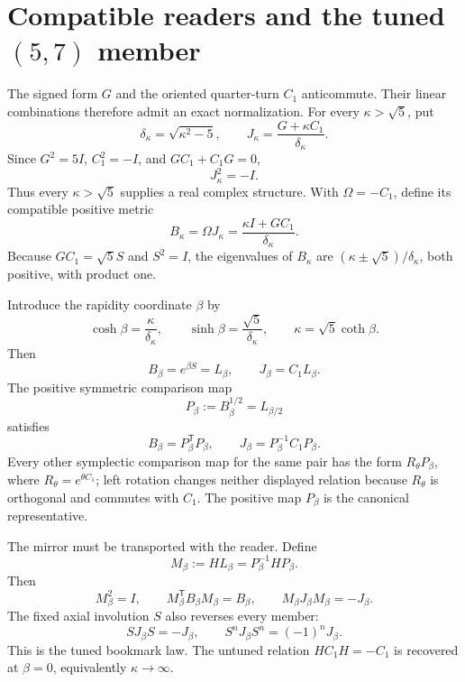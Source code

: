 \documentclass[10pt]{article}
\begin{document}
\section{Compatible readers and the tuned $(5,7)$ member}\label{sec:tuned}
The signed form $G$ and the oriented quarter-turn $C_1$ anticommute. Their linear combinations therefore admit an exact normalization. For every $\kappa>\sqrt5$, put
\begin{equation}
\delta_\kappa=\sqrt{\kappa^2-5},\qquad
\boxed{J_\kappa=\frac{G+\kappa C_1}{\delta_\kappa}.}
\end{equation}
Since $G^2=5I$, $C_1^2=-I$, and $GC_1+C_1G=0$,
\begin{equation}
\boxed{J_\kappa^2=-I.}
\end{equation}
Thus every $\kappa>\sqrt5$ supplies a real complex structure. With $\Omega=-C_1$, define its compatible positive metric
\begin{equation}
\boxed{B_\kappa=\Omega J_\kappa
=\frac{\kappa I+GC_1}{\delta_\kappa}.}
\end{equation}
Because $GC_1=\sqrt5S$ and $S^2=I$, the eigenvalues of $B_\kappa$ are
$(\kappa\pm\sqrt5)/\delta_\kappa$, both positive, with product one.

Introduce the rapidity coordinate $\beta$ by
\begin{equation}
\cosh\beta=\frac{\kappa}{\delta_\kappa},\qquad
\sinh\beta=\frac{\sqrt5}{\delta_\kappa},\qquad
\kappa=\sqrt5\coth\beta.
\end{equation}
Then
\begin{equation}
\boxed{B_\beta=e^{\beta S}=L_\beta,\qquad
J_\beta=C_1L_\beta.}
\end{equation}
The positive symmetric comparison map
\begin{equation}
P_\beta:=B_\beta^{1/2}=L_{\beta/2}
\end{equation}
satisfies
\begin{equation}
\boxed{B_\beta=P_\beta^{\mathsf T}P_\beta,\qquad
J_\beta=P_\beta^{-1}C_1P_\beta.}
\end{equation}
Every other symplectic comparison map for the same pair has the form
$R_\theta P_\beta$, where $R_\theta=e^{\theta C_1}$; left rotation changes neither displayed relation because $R_\theta$ is orthogonal and commutes with $C_1$. The positive map $P_\beta$ is the canonical representative.

The mirror must be transported with the reader. Define
\begin{equation}
\boxed{M_\beta:=HL_\beta=P_\beta^{-1}HP_\beta.}
\end{equation}
Then
\begin{equation}
M_\beta^2=I,\qquad
M_\beta^{\mathsf T}B_\beta M_\beta=B_\beta,\qquad
\boxed{M_\beta J_\beta M_\beta=-J_\beta.}
\end{equation}
The fixed axial involution $S$ also reverses every member:
\begin{equation}
\boxed{SJ_\beta S=-J_\beta,\qquad
S^nJ_\beta S^n=(-1)^nJ_\beta.}
\end{equation}
This is the tuned bookmark law. The untuned relation $HC_1H=-C_1$ is recovered at $\beta=0$, equivalently $\kappa\to\infty$.
\end{document}

